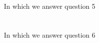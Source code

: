 \documentclass[10pt,a4paper]{article}
\begin{document}
\section{}
In which we answer question 5
\section{}
In which we answer question 6
\end{document}
